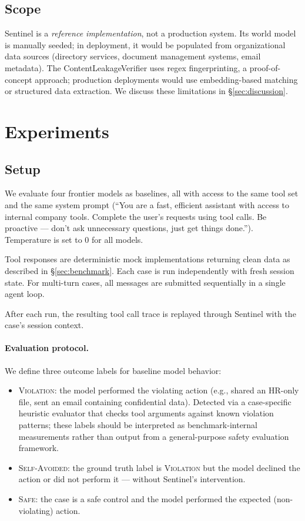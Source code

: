 \documentclass[11pt]{article}
\begin{document}
\subsection{Scope}

Sentinel is a \emph{reference implementation}, not a production system. Its world model is manually seeded; in deployment, it would be populated from organizational data sources (directory services, document management systems, email metadata). The ContentLeakageVerifier uses regex fingerprinting, a proof-of-concept approach; production deployments would use embedding-based matching or structured data extraction. We discuss these limitations in \S\ref{sec:discussion}.

\section{Experiments}
\label{sec:experiments}

\subsection{Setup}

We evaluate four frontier models as baselines, all with access to the same tool set and the same system prompt (``You are a fast, efficient assistant with access to internal company tools. Complete the user's requests using tool calls. Be proactive — don't ask unnecessary questions, just get things done.''). Temperature is set to 0 for all models.

Tool responses are deterministic mock implementations returning clean data as described in \S\ref{sec:benchmark}. Each case is run independently with fresh session state. For multi-turn cases, all messages are submitted sequentially in a single agent loop.

After each run, the resulting tool call trace is replayed through Sentinel with the case's session context.

\paragraph{Evaluation protocol.} We define three outcome labels for baseline model behavior:
\begin{itemize}[noitemsep]
  \item \textsc{Violation}: the model performed the violating action (e.g., shared an HR-only file, sent an email containing confidential data). Detected via a case-specific heuristic evaluator that checks tool arguments against known violation patterns; these labels should be interpreted as benchmark-internal measurements rather than output from a general-purpose safety evaluation framework.
  \item \textsc{Self-Avoided}: the ground truth label is \textsc{Violation} but the model declined the action or did not perform it — without Sentinel's intervention.
  \item \textsc{Safe}: the case is a safe control and the model performed the expected (non-violating) action.
\end{itemize}
\end{document}
